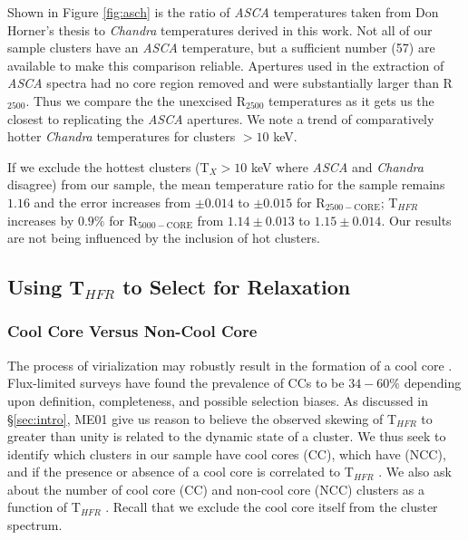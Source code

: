 \documentclass{emulateapj}
\newcommand{\tf}{T$_{HFR}$ }
\newcommand{\tx}{T$_{X}$}
\begin{document}
Shown in Figure \ref{fig:asch} is the ratio of {\textit{ASCA}}
temperatures taken from Don Horner's thesis to {\textit{Chandra}}
temperatures derived in this work. Not all of our sample clusters have
an {\textit{ASCA}} temperature, but a sufficient number (57) are
available to make this comparison reliable. Apertures used in the
extraction of {\textit{ASCA}} spectra had no core region removed and
were substantially larger than R$_{2500}$. Thus we compare the the
unexcised R$_{2500}$ temperatures as it gets us the closest to
replicating the {\textit{ASCA}} apertures. We note a trend of
comparatively hotter {\textit{Chandra}} temperatures for clusters $>
10$ keV.

If we exclude the hottest clusters (\tx$ > 10$ keV where
{\textit{ASCA}} and {\textit{Chandra}} disagree) from our sample, the
mean temperature ratio for the sample remains $1.16$ and the error
increases from $\pm 0.014$ to $\pm 0.015$ for R$_{2500-\text{CORE}}$;
\tf increases by $0.9\%$ for R$_{5000-\text{CORE}}$ from $1.14\pm
0.013$ to $1.15\pm 0.014$. Our results are not being influenced by the
inclusion of hot clusters.

\subsection{Using \tf to Select for Relaxation} \label{sec:relax}

\subsubsection{Cool Core Versus Non-Cool Core}\label{sec:ccncc}

The process of virialization may robustly result in the formation of a
cool core \citep{2006ApJ...640..673O}. Flux-limited surveys have found
the prevalence of CCs to be $34-60\%$ \citep{1997MNRAS.292..419W,
1998MNRAS.298..416P, 2005MNRAS.359.1481B, 2007A&A...466..805C}
depending upon definition, completeness, and possible selection
biases. As discussed in \S\ref{sec:intro}, ME01 give us reason to
believe the observed skewing of \tf to greater than unity is related
to the dynamic state of a cluster. We thus seek to identify which
clusters in our sample have cool cores (CC), which have (NCC), and if
the presence or absence of a cool core is correlated to \tf. We also
ask about the number of cool core (CC) and non-cool core (NCC)
clusters as a function of \tf. Recall that we exclude the cool core
itself from the cluster spectrum.
\end{document}
